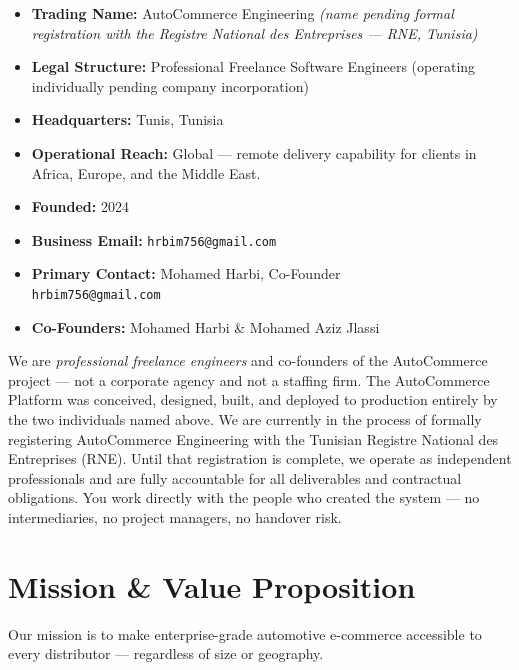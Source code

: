 \documentclass[11pt,a4paper]{article}
\begin{document}
\begin{itemize}[leftmargin=1.4em,itemsep=4pt]
  \item \textbf{Trading Name:} AutoCommerce Engineering
        \textit{(name pending formal registration with the
        Registre National des Entreprises --- RNE, Tunisia)}
  \item \textbf{Legal Structure:} Professional Freelance Software
        Engineers (operating individually pending company
        incorporation)
  \item \textbf{Headquarters:} Tunis, Tunisia
  \item \textbf{Operational Reach:} Global --- remote delivery
        capability for clients in Africa, Europe, and the
        Middle East.
  \item \textbf{Founded:} 2024
  \item \textbf{Business Email:} \texttt{hrbim756@gmail.com}
  \item \textbf{Primary Contact:} Mohamed Harbi, Co-Founder\\
        \texttt{hrbim756@gmail.com}
  \item \textbf{Co-Founders:} Mohamed Harbi \& Mohamed Aziz Jlassi
\end{itemize}

\bigskip
\noindent We are \emph{professional freelance engineers} and
co-founders of the AutoCommerce project --- not a corporate agency
and not a staffing firm. The AutoCommerce Platform was conceived,
designed, built, and deployed to production entirely by the two
individuals named above. We are currently in the process of
formally registering AutoCommerce Engineering with the Tunisian
Registre National des Entreprises (RNE). Until that registration
is complete, we operate as independent professionals and are fully
accountable for all deliverables and contractual obligations. You
work directly with the people who created the system --- no
intermediaries, no project managers, no handover risk.

\section{Mission \& Value Proposition}

Our mission is to make enterprise-grade automotive e-commerce
accessible to every distributor --- regardless of size or geography.
\end{document}
